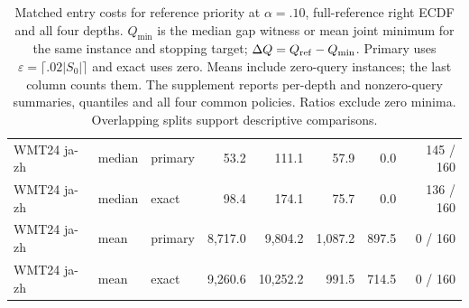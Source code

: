 \begin{table}[t]
\begin{tabular}{lllrrrrr}
WMT24 ja-zh & median & primary & 53.2 & 111.1 & 57.9 & 0.0 & 145 / 160 \\
WMT24 ja-zh & median & exact & 98.4 & 174.1 & 75.7 & 0.0 & 136 / 160 \\
WMT24 ja-zh & mean & primary & 8,717.0 & 9,804.2 & 1,087.2 & 897.5 & 0 / 160 \\
WMT24 ja-zh & mean & exact & 9,260.6 & 10,252.2 & 991.5 & 714.5 & 0 / 160 \\
\bottomrule
\end{tabular}
\caption{Matched entry costs for reference priority at $\alpha=.10$, full-reference right ECDF and all four depths. $Q_{\min}$ is the median gap witness or mean joint minimum for the same instance and stopping target; $\Delta Q=Q_{\rm ref}-Q_{\min}$. Primary uses $\varepsilon=\lceil.02|S_0|\rceil$ and exact uses zero. Means include zero-query instances; the last column counts them. The supplement reports per-depth and nonzero-query summaries, quantiles and all four common policies. Ratios exclude zero minima. Overlapping splits support descriptive comparisons.}
\label{tab:matched-entry-costs}
\end{table}
